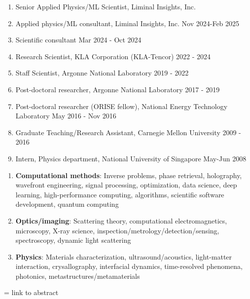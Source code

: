 \documentclass[11pt]{article}
\begin{document}
\begin{enumerate}
    \item Senior Applied Physics/ML Scientist, Liminal Insights, Inc. 
    \item Applied physics/ML consultant, Liminal Insights, Inc. \hfill Nov 2024-Feb 2025
    \item Scientific consultant \hfill Mar 2024 - Oct 2024
    \item Research Scientist, KLA Corporation (KLA-Tencor) \hfill 2022 - 2024
    \item Staff Scientist, Argonne National Laboratory \hfill 2019 - 2022
    \item Post-doctoral researcher, Argonne National Laboratory \hfill 2017 - 2019
    \item Post-doctoral researcher (ORISE fellow), National Energy Technology Laboratory  \hfill May 2016 - Nov 2016
    \item Graduate Teaching/Research Assistant, Carnegie Mellon University \hfill 2009 - 2016
    \item Intern, Physics department, National University of Singapore \hfill May-Jun 2008 
\end{enumerate} 

\begin{enumerate}
    \item \textbf{Computational methods}: Inverse problems, phase retrieval, holography, wavefront engineering, signal processing, optimization, data science, deep learning, high-performance computing, algorithms, scientific software development, quantum computing
    \item \textbf{Optics/imaging}: Scattering theory, computational electromagnetics, microscopy, X-ray science, inspection/metrology/detection/sensing, spectroscopy, dynamic light scattering 
    \item \textbf{Physics}: Materials characterization, ultrasound/acoustics, light-matter interaction, crysallography, interfacial dynamics, time-resolved phenomena, photonics, metastructures/metamaterials
\end{enumerate} 

 = link to abstract
\end{document}
